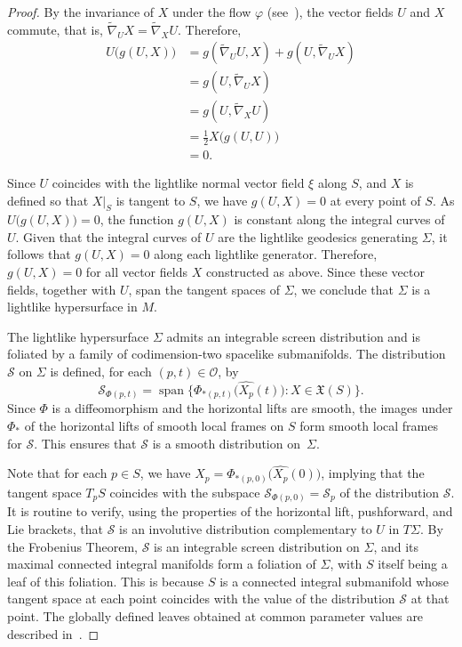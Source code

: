 \documentclass[11pt]{article}
\numberwithin{equation}{section}
\begin{document}
\begin{proof}
		By the invariance of $X$ under the flow $\varphi$ (see~\cite[Th.~9.42]{lee2}), the vector fields $U$ and $X$ commute, that is, $ \widetilde{\nabla}_U X =\widetilde{\nabla}_X U $. Therefore,
		\begin{align*}
			U\bigl(g(U,X)\bigr) &= g(\widetilde{\nabla}_U U, X) + g(U, \widetilde{\nabla}_U X) \\
			&= g(U, \widetilde{\nabla}_U X) 
			\\
			&= g(U, \widetilde{\nabla}_X U) 
			\\
			&= \frac{1}{2} X\bigl(g(U,U)\bigr) 
			\\
			&= 0.
		\end{align*}
		
		Since $U$ coincides with the lightlike normal vector field $\xi$ along $S$, and $X$ is defined so that $X|_S$ is tangent to $S$, we have $g(U, X) = 0$ at every point of $S$. As $U\bigl(g(U,X)\bigr) = 0$, the function $g(U,X)$ is constant along the integral curves of $U$. Given that the integral curves of $U$ are the lightlike geodesics generating $\Sigma$, it follows that $g(U,X) = 0$ along each lightlike generator. Therefore, $g(U,X) = 0$ for all vector fields $X$ constructed as above. Since these vector fields, together with $U$, span the tangent spaces of $\Sigma$, we conclude that $\Sigma$ is a lightlike hypersurface in $M$. 
		
		
		The lightlike hypersurface $\Sigma$ admits an integrable screen distribution and is foliated by a family of codimension-two spacelike submanifolds. The distribution $\mathcal{S}$ on $\Sigma$ is defined, for each $(p,t) \in \mathscr{O}$, by
		\[
		\mathcal{S}_{\Phi(p,t)} = \operatorname{span}\bigl\{ \Phi_{*(p,t)}\bigl(\widehat{X_p}(t)\bigr) : X \in {\mathfrak X}(S) \bigr\}.
		\]
		Since $\Phi$ is a diffeomorphism and the horizontal lifts are smooth, the images under $\Phi_{*}$ of the horizontal lifts of smooth local frames on $S$ form smooth local frames for $\mathcal{S}$. This ensures that $\mathcal{S}$ is a smooth distribution on~$\Sigma$.
		
	Note that for each $p \in S$, we have $X_p = \Phi_{*(p,0)}\bigl(\widehat{X_p}(0)\bigr)$, implying that the tangent space $T_pS$ coincides with the subspace $\mathcal{S}_{\Phi(p,0)} = \mathcal{S}_p$ of the distribution $\mathcal S$. It is routine to verify, using the properties of the horizontal lift, pushforward, and Lie brackets, that $\mathcal{S}$ is an involutive distribution complementary to $U$ in $T\Sigma$. By the Frobenius Theorem, $\mathcal{S}$ is an integrable screen distribution on $\Sigma$, and its maximal connected integral manifolds form a foliation of $\Sigma$, with $S$ itself being a leaf of this foliation. This is because $S$ is a connected integral submanifold whose tangent space at each point coincides with the value of the distribution $\mathcal{S}$ at that point. The globally defined leaves obtained at common parameter values are described in~.
		

\end{proof}
\end{document}
